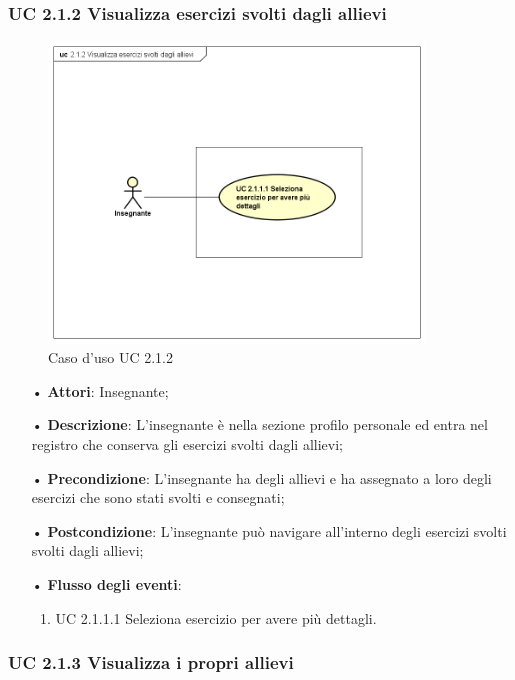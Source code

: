 \subsubsection{UC 2.1.2  Visualizza esercizi svolti dagli allievi}
\begin{figure}[H]
\centering
\includegraphics[width=10cm]{img/UC212.png} 
\caption{Caso d'uso UC 2.1.2}
\end{figure}
\begin{itemize}
	\item[•] \textbf{Attori}: Insegnante;
	\item[•] \textbf{Descrizione}:  L’insegnante è nella sezione profilo personale ed entra
		nel registro che conserva gli esercizi svolti dagli allievi;
	\item[•] \textbf{Precondizione}:  L’insegnante ha degli allievi e ha assegnato a loro degli esercizi che sono stati svolti e consegnati;

	\item[•] \textbf{Postcondizione}: L’insegnante può navigare all’interno degli esercizi svolti 
                       svolti dagli allievi; 

	\item[•] \textbf{Flusso degli eventi}:
		\begin{enumerate}
			\item UC 2.1.1.1  Seleziona esercizio per avere più dettagli.	
		\end{enumerate}
\end{itemize}
\subsubsection{UC 2.1.3 Visualizza i propri allievi}

